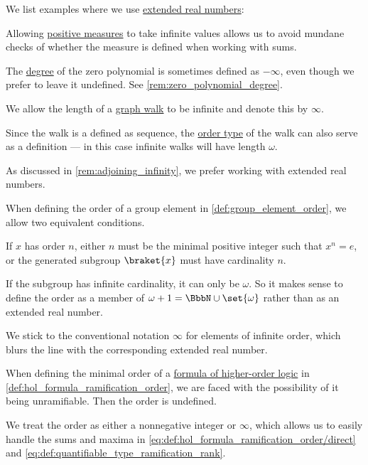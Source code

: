 \begin{example}\label{ex:def:extended_real_numbers}
  We list examples where we use \hyperref[def:extended_real_numbers]{extended real numbers}:
  \begin{thmenum}
     Allowing \hyperref[def:measure/positive]{positive measures} to take infinite values allows us to avoid mundane checks of whether the measure is defined when working with sums.

     The \hyperref[def:polynomial_degree]{degree} of the zero polynomial is sometimes defined as \( -\infty \), even though we prefer to leave it undefined. See \cref{rem:zero_polynomial_degree}.

     We allow the length of a \hyperref[def:graph_walk]{graph walk} to be infinite and denote this by \( \infty \).

    Since the walk is a defined as sequence, the \hyperref[thm:well_ordered_order_type_existence]{order type} of the walk can also serve as a definition --- in this case infinite walks will have length \( \omega \).

    As discussed in \cref{rem:adjoining_infinity}, we prefer working with extended real numbers.

     When defining the order of a group element in \cref{def:group_element_order}, we allow two equivalent conditions.

    If \( x \) has order \( n \), either \( n \) must be the minimal positive integer such that \( x^n = e \), or the generated subgroup \( \braket{ x } \) must have cardinality \( n \).

    If the subgroup has infinite cardinality, it can only be \( \omega \). So it makes sense to define the order as a member of \( \omega + 1 = \BbbN \cup \set{ \omega } \) rather than as an extended real number.

    We stick to the conventional notation \( \infty \) for elements of infinite order, which blurs the line with the corresponding extended real number.

     When defining the minimal order of a \hyperref[def:hol_term/formula]{formula of higher-order logic} in \cref{def:hol_formula_ramification_order}, we are faced with the possibility of it being unramifiable. Then the order is undefined.

    We treat the order as either a nonnegative integer or \( \infty \), which allows us to easily handle the sums and maxima in \eqref{eq:def:hol_formula_ramification_order/direct} and \eqref{eq:def:quantifiable_type_ramification_rank}.
  \end{thmenum}
\end{example}

